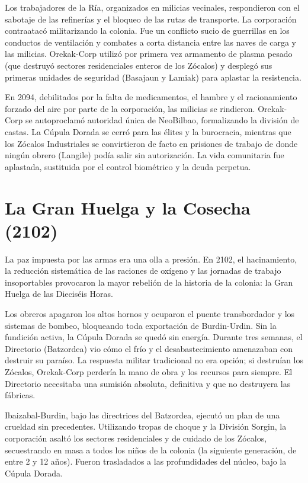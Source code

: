  Los trabajadores de la Ría, organizados en milicias vecinales, respondieron con el sabotaje de las refinerías y el bloqueo de las rutas de transporte. La corporación contraatacó militarizando la colonia. Fue un conflicto sucio de guerrillas en los conductos de ventilación y combates a corta distancia entre las naves de carga y las milicias. Orekak-Corp utilizó por primera vez armamento de plasma pesado (que destruyó sectores residenciales enteros de los Zócalos) y desplegó sus primeras unidades de seguridad (Basajaun y Lamiak) para aplastar la resistencia.

 En 2094, debilitados por la falta de medicamentos, el hambre y el racionamiento forzado del aire por parte de la corporación, las milicias se rindieron. Orekak-Corp se autoproclamó autoridad única de NeoBilbao, formalizando la división de castas. La Cúpula Dorada se cerró para las élites y la burocracia, mientras que los Zócalos Industriales se convirtieron de facto en prisiones de trabajo de donde ningún obrero (Langile) podía salir sin autorización. La vida comunitaria fue aplastada, sustituida por el control biométrico y la deuda perpetua.

\section{La Gran Huelga y la Cosecha (2102)}

La paz impuesta por las armas era una olla a presión. En 2102, el hacinamiento, la reducción sistemática de las raciones de oxígeno y las jornadas de trabajo insoportables provocaron la mayor rebelión de la historia de la colonia: la Gran Huelga de las Dieciséis Horas.

 Los obreros apagaron los altos hornos y ocuparon el puente transbordador y los sistemas de bombeo, bloqueando toda exportación de Burdin-Urdin. Sin la fundición activa, la Cúpula Dorada se quedó sin energía. Durante tres semanas, el Directorio (Batzordea) vio cómo el frío y el desabastecimiento amenazaban con destruir su paraíso. La respuesta militar tradicional no era opción; si destruían los Zócalos, Orekak-Corp perdería la mano de obra y los recursos para siempre. El Directorio necesitaba una sumisión absoluta, definitiva y que no destruyera las fábricas.

 Ibaizabal-Burdin, bajo las directrices del Batzordea, ejecutó un plan de una crueldad sin precedentes. Utilizando tropas de choque y la División Sorgin, la corporación asaltó los sectores residenciales y de cuidado de los Zócalos, secuestrando en masa a todos los niños de la colonia (la siguiente generación, de entre 2 y 12 años). Fueron trasladados a las profundidades del núcleo, bajo la Cúpula Dorada.

